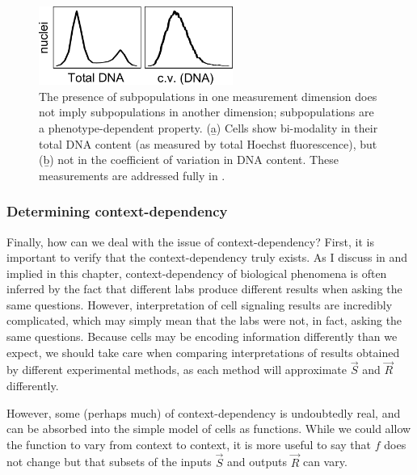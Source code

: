   \begin{figure}[!bt]
  \centering
  \includegraphics[width=2.5in]{FIGS/introduction/subpops.pdf}
  {\singlespacing 
  \caption[Cellular subpopulations are phenotype-dependent]
          { The presence of subpopulations in one measurement dimension
            does not imply subpopulations in another dimension;
            subpopulations are a phenotype-dependent property.
            (\b{a}) Cells show bi-modality in their total DNA content
            (as measured by total Hoechst fluorescence), but 
            (\b{b}) not in the coefficient of variation in DNA content.
            These measurements are addressed fully in .}
  \label{fig:introduction:subpops}}
  \end{figure}



\subsubsection{Determining context-dependency}

Finally, how can we deal with the issue of context-dependency?
First, it is important to verify that the context-dependency truly exists.
As I discuss in  and implied in this chapter,
context-dependency of biological phenomena is often inferred by
the fact that different labs produce different results when asking
the same questions. However, interpretation of cell signaling results
are incredibly complicated, which may
simply mean that the labs were not, in fact, asking the same questions.
Because cells
may be encoding information differently than we expect, we should
take care when comparing interpretations of results obtained by different
experimental methods, as each method will approximate $\vec{S}$ and $\vec{R}$
differently.


However, some (perhaps much) of context-dependency is undoubtedly
real, and can be absorbed into the simple model of cells as functions.
While we could allow the function to vary from context to context,
it is more useful to say that $f$ does not change but that
subsets of the inputs $\vec{S}$ and outputs $\vec{R}$ can vary.


